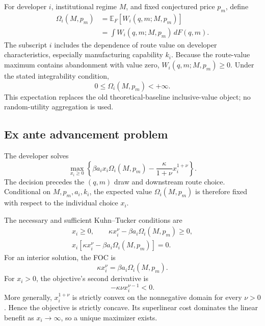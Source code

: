For developer \(i\), institutional regime \(M\), and fixed conjectured price
\(p_m\), define
\begin{equation}
  \begin{aligned}
  \Omega_i(M,p_m)
  &=
  \mathbb E_F\!\left[
    W_i(q,m;M,p_m)
  \right]\\
  &=
  \int W_i(q,m;M,p_m)\,dF(q,m).
  \end{aligned}
  \label{eq:p05-expected-value}
\end{equation}
The subscript \(i\) includes the dependence of route value on developer
characteristics, especially manufacturing capability \(k_i\). Because the
route-value maximum contains abandonment with value zero,
\(W_i(q,m;M,p_m)\geq0\). Under the stated integrability condition,
\[
  0\leq\Omega_i(M,p_m)<+\infty.
\]
This expectation replaces the old theoretical-baseline inclusive-value
object; no random-utility aggregation is used.

\subsection{Ex ante advancement problem}
\label{subsec:p05-problem}

The developer solves
\begin{equation}
  \max_{x_i\geq0}
  \left\{
    \beta a_ix_i\Omega_i(M,p_m)
    -
    \frac{\kappa}{1+\nu}x_i^{1+\nu}
  \right\}.
  \label{eq:p05-advancement-objective}
\end{equation}
The decision precedes the \((q,m)\) draw and downstream route choice.
Conditional on \(M,p_m,a_i,k_i\), the expected value
\(\Omega_i(M,p_m)\) is therefore fixed with respect to the individual
choice \(x_i\).

The necessary and sufficient Kuhn--Tucker conditions are
\begin{equation}
  \begin{gathered}
  x_i\geq0,\qquad
  \kappa x_i^\nu-\beta a_i\Omega_i(M,p_m)\geq0,\\
  x_i\left[
    \kappa x_i^\nu-\beta a_i\Omega_i(M,p_m)
  \right]=0.
  \end{gathered}
  \label{eq:p05-kkt}
\end{equation}
For an interior solution, the FOC is
\begin{equation}
  \kappa x_i^\nu
  =
  \beta a_i\Omega_i(M,p_m).
  \label{eq:p05-foc}
\end{equation}
For \(x_i>0\), the objective's second derivative is
\begin{equation}
  -\kappa\nu x_i^{\nu-1}<0.
  \label{eq:p05-soc}
\end{equation}
More generally, \(x_i^{1+\nu}\) is strictly convex on the nonnegative
domain for every \(\nu>0\). Hence the objective is strictly concave.
Its superlinear cost dominates the linear benefit as \(x_i\to\infty\), so a
unique maximizer exists.

